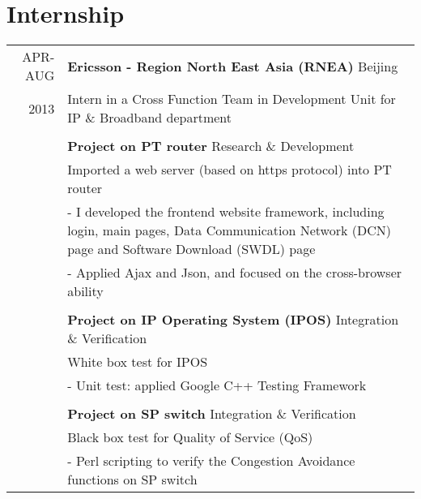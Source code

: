 \documentclass[a4paper,10pt]{article}
\begin{document}
\section{Internship}
\begin{tabular}{rp{12cm}}
\textsc{APR-AUG} & \textbf{Ericsson - Region North East Asia (RNEA)}
\hfill{\textcolor[rgb]{0.7,0.7,0.7}{Beijing}}\\
\textsc{2013}&Intern in a Cross Function Team in Development Unit for IP \& Broadband department\\
\\
&\textbf{Project on PT router}
\hfill{\textcolor[rgb]{0.7,0.7,0.7}{Research \& Development}}\\
&Imported a web server (based on https protocol) into PT router\\
& - I developed the frontend website framework, including login, main pages, Data Communication Network (DCN) page and Software Download (SWDL) page\\
& - Applied Ajax and Json, and focused on the cross-browser ability\\
\\
&\textbf{Project on IP Operating System (IPOS)}
\hfill{\textcolor[rgb]{0.7,0.7,0.7}{Integration \& Verification}}\\
&White box test for IPOS\\
& - Unit test: applied Google C++ Testing Framework\\
\\
&\textbf{ Project on SP switch} 
\hfill{\textcolor[rgb]{0.7,0.7,0.7}{Integration \& Verification}}\\
&Black box test for Quality of Service (QoS)\\
& - Perl scripting to verify the Congestion Avoidance functions on SP switch\\
\end{tabular}

\end{document}
